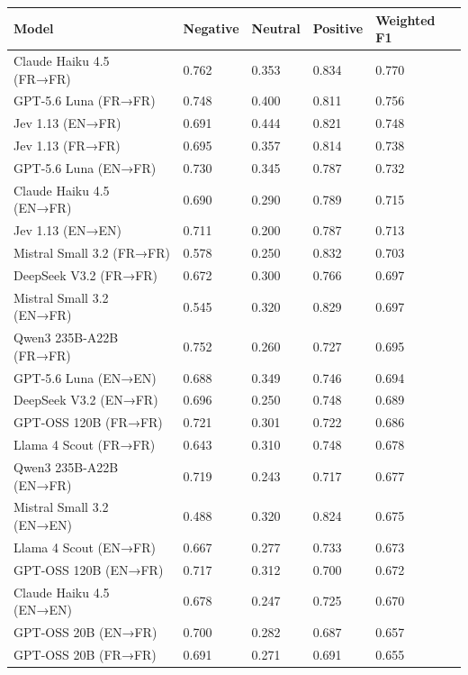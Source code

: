 \documentclass[
  man,
  floatsintext,
  longtable,
  nolmodern,
  notxfonts,
  notimes,
  mask,
  colorlinks=true,linkcolor=blue,citecolor=blue,urlcolor=blue]{apa7}
\begin{document}
\begin{table}

{\caption{{F1 Scores for 3-Category
Classification}{\label{tbl-f1-3cat}}}
\vspace{-20pt}}

\begin{longtable}[]{@{}lllll@{}}
\toprule\noalign{}
Model & Negative & Neutral & Positive & Weighted F1 \\
\midrule\noalign{}
\endhead
\bottomrule\noalign{}
\endlastfoot
Claude Haiku 4.5 (FR→FR) & 0.762 & 0.353 & 0.834 & 0.770 \\
GPT-5.6 Luna (FR→FR) & 0.748 & 0.400 & 0.811 & 0.756 \\
Jev 1.13 (EN→FR) & 0.691 & 0.444 & 0.821 & 0.748 \\
Jev 1.13 (FR→FR) & 0.695 & 0.357 & 0.814 & 0.738 \\
GPT-5.6 Luna (EN→FR) & 0.730 & 0.345 & 0.787 & 0.732 \\
Claude Haiku 4.5 (EN→FR) & 0.690 & 0.290 & 0.789 & 0.715 \\
Jev 1.13 (EN→EN) & 0.711 & 0.200 & 0.787 & 0.713 \\
Mistral Small 3.2 (FR→FR) & 0.578 & 0.250 & 0.832 & 0.703 \\
DeepSeek V3.2 (FR→FR) & 0.672 & 0.300 & 0.766 & 0.697 \\
Mistral Small 3.2 (EN→FR) & 0.545 & 0.320 & 0.829 & 0.697 \\
Qwen3 235B-A22B (FR→FR) & 0.752 & 0.260 & 0.727 & 0.695 \\
GPT-5.6 Luna (EN→EN) & 0.688 & 0.349 & 0.746 & 0.694 \\
DeepSeek V3.2 (EN→FR) & 0.696 & 0.250 & 0.748 & 0.689 \\
GPT-OSS 120B (FR→FR) & 0.721 & 0.301 & 0.722 & 0.686 \\
Llama 4 Scout (FR→FR) & 0.643 & 0.310 & 0.748 & 0.678 \\
Qwen3 235B-A22B (EN→FR) & 0.719 & 0.243 & 0.717 & 0.677 \\
Mistral Small 3.2 (EN→EN) & 0.488 & 0.320 & 0.824 & 0.675 \\
Llama 4 Scout (EN→FR) & 0.667 & 0.277 & 0.733 & 0.673 \\
GPT-OSS 120B (EN→FR) & 0.717 & 0.312 & 0.700 & 0.672 \\
Claude Haiku 4.5 (EN→EN) & 0.678 & 0.247 & 0.725 & 0.670 \\
GPT-OSS 20B (EN→FR) & 0.700 & 0.282 & 0.687 & 0.657 \\
GPT-OSS 20B (FR→FR) & 0.691 & 0.271 & 0.691 & 0.655 \\

\end{longtable}
\end{table}
\end{document}
